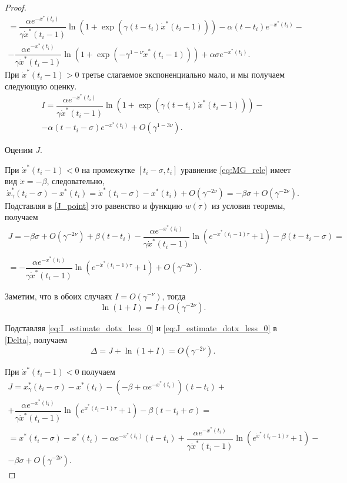 \begin{proof}
\begin{multline}
	= \dfrac{\alpha e^{-x^*(t_i)}}{\gamma \dot{x}^*(t_i - 1)}\ln\left(1 + \exp(\gamma(t - t_i)\dot{x}^*(t_i - 1))\right) - \alpha (t - t_i) e^{-x^*(t_i)} -\\- \dfrac{\alpha e^{-x^*(t_i)}}{\gamma \dot{x}^*(t_i - 1)}\ln\left(1 + \exp(-\gamma^{1 - \nu}\dot{x}^*(t_i - 1))\right) + \alpha \sigma e^{-x^*(t_i)}. 
	\end{multline}
	При $\dot{x}^*(t_i - 1) > 0$ третье слагаемое экспоненциально мало, и мы получаем следующую оценку.
	\begin{multline}
		\label{eq:I_estimate_dotx_greater_0}
		I = \dfrac{\alpha e^{-x^*(t_i)}}{\gamma \dot{x}^*(t_i - 1)}\ln\left(1 + \exp(\gamma(t - t_i)\dot{x}^*(t_i - 1))\right) -\\- \alpha (t - t_i - \sigma) e^{-x^*(t_i)} + O(\gamma^{1 - 3\nu}).
	\end{multline}
	
	Оценим $J$.
	
	При $\dot{x}^*(t_i - 1) < 0$ на промежутке $[t_i - \sigma, t_i]$ уравнение \eqref{eq:MG_rele} имеет вид $\dot{x} = -\beta$, следовательно, 
	\[
	\dot{x}_{\gamma}^*(t_i - \sigma) - x^*(t_i) = \dot{x}^*(t_i - \sigma) - x^*(t_i) + O(\gamma^{-2\nu}) = -\beta \sigma + O(\gamma^{-2\nu}).
	\]
	Подставляя в \eqref{J_point} это равенство и функцию $w(\tau)$ из условия теоремы, получаем
	\begin{multline}
		\label{eq:J_estimate_dotx_less_0}
	J = -\beta \sigma + O(\gamma^{-2\nu}) + \beta (t - t_i) - \dfrac{\alpha e^{-x^*(t_i)}}{\gamma \dot{x}^*(t_i - 1)} \ln\left(e^{-\dot{x}^*(t_i - 1)\tau} + 1\right) - \beta(t - t_i - \sigma) =\\
	\\= -\dfrac{\alpha e^{-x^*(t_i)}}{\gamma \dot{x}^*(t_i - 1)} \ln\left(e^{-\dot{x}^*(t_i - 1)\tau} + 1\right) + O(\gamma^{-2\nu}).
	\end{multline}
	
	Заметим, что в обоих случаях $I = O(\gamma^{-\nu})$, тогда 
	\begin{equation}
	\label{eq:ln_1_plus_I}
	\ln(1 + I) = I + O(\gamma^{-2\nu}).
	\end{equation}
	
	Подставляя \eqref{eq:I_estimate_dotx_less_0} и \eqref{eq:J_estimate_dotx_less_0} в \eqref{Delta}, получаем
	\[
	\Delta = J + \ln(1 + I) = O(\gamma^{-2\nu}).
	\]
	
	При $\dot{x}^*(t_i - 1) < 0$ получаем
	\begin{multline}
	\label{eq:J_estimate_dotx_greater_0}
	J = x_{\gamma}^*(t_i - \sigma) - x^*(t_i) - (-\beta + \alpha e^{-x^*(t_i)})(t - t_i) +\\+ \dfrac{\alpha e^{-x^*(t_i)}}{\gamma \dot{x}^*(t_i - 1)} \ln\left(e^{\dot{x}^*(t_i - 1)\tau} + 1\right) - \beta(t - t_i + \sigma) =\\
	= x^*(t_i - \sigma) - x^*(t_i) - \alpha e^{-x^*(t_i)}(t - t_i) + \dfrac{\alpha e^{-x^*(t_i)}}{\gamma \dot{x}^*(t_i - 1)} \ln\left(e^{\dot{x}^*(t_i - 1)\tau} + 1\right) -\\- \beta\sigma + O(\gamma^{-2\nu}).
	\end{multline}
	

\end{proof}
